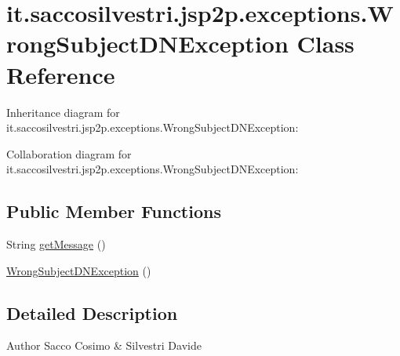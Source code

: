 \hypertarget{classit_1_1saccosilvestri_1_1jsp2p_1_1exceptions_1_1_wrong_subject_d_n_exception}{
\section{it.saccosilvestri.jsp2p.exceptions.\-Wrong\-Subject\-D\-N\-Exception \-Class \-Reference}
\label{classit_1_1saccosilvestri_1_1jsp2p_1_1exceptions_1_1_wrong_subject_d_n_exception}
}


\-Inheritance diagram for it.saccosilvestri.jsp2p.exceptions.\-Wrong\-Subject\-D\-N\-Exception\-:


\-Collaboration diagram for it.saccosilvestri.jsp2p.exceptions.\-Wrong\-Subject\-D\-N\-Exception\-:
\subsection*{\-Public \-Member \-Functions}
\begin{DoxyCompactItemize}
\item 
\-String \hyperlink{classit_1_1saccosilvestri_1_1jsp2p_1_1exceptions_1_1_wrong_subject_d_n_exception_a1965f0b9768f153eec8c9dc8f7470b44}{get\-Message} ()
\item 
\hyperlink{classit_1_1saccosilvestri_1_1jsp2p_1_1exceptions_1_1_wrong_subject_d_n_exception_a156060e1f82f10582f11b2669377c825}{\-Wrong\-Subject\-D\-N\-Exception} ()
\end{DoxyCompactItemize}


\subsection{\-Detailed \-Description}
\begin{DoxyAuthor}{\-Author}
\-Sacco \-Cosimo \& \-Silvestri \-Davide 
\end{DoxyAuthor}


